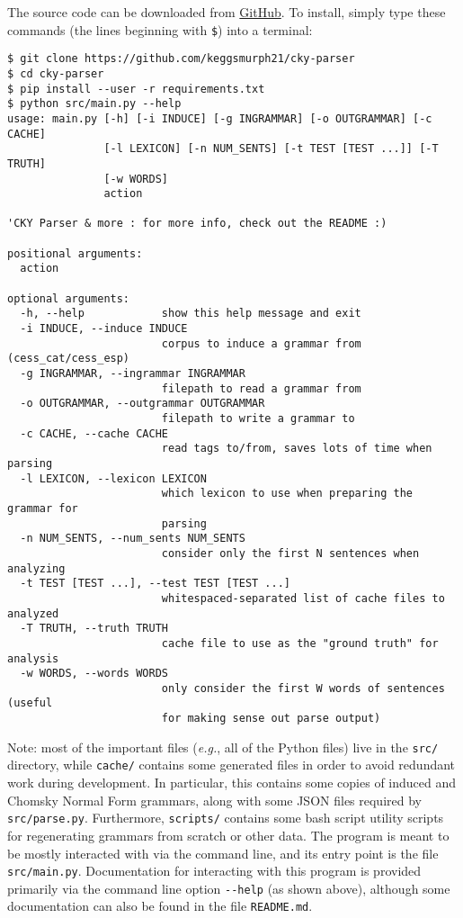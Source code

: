 \documentclass[paper=a4, fontsize=11pt]{scrartcl} %
\begin{document}
The source code can be downloaded from \href{https://github.com/keggsmurph21/cky-parser}{GitHub}.  To install, simply type these commands (the lines beginning with \texttt{\$}) into a terminal:
\begin{verbatim}
$ git clone https://github.com/keggsmurph21/cky-parser
$ cd cky-parser
$ pip install --user -r requirements.txt
$ python src/main.py --help
usage: main.py [-h] [-i INDUCE] [-g INGRAMMAR] [-o OUTGRAMMAR] [-c CACHE]
               [-l LEXICON] [-n NUM_SENTS] [-t TEST [TEST ...]] [-T TRUTH]
               [-w WORDS]
               action

'CKY Parser & more : for more info, check out the README :)

positional arguments:
  action

optional arguments:
  -h, --help            show this help message and exit
  -i INDUCE, --induce INDUCE
                        corpus to induce a grammar from (cess_cat/cess_esp)
  -g INGRAMMAR, --ingrammar INGRAMMAR
                        filepath to read a grammar from
  -o OUTGRAMMAR, --outgrammar OUTGRAMMAR
                        filepath to write a grammar to
  -c CACHE, --cache CACHE
                        read tags to/from, saves lots of time when parsing
  -l LEXICON, --lexicon LEXICON
                        which lexicon to use when preparing the grammar for
                        parsing
  -n NUM_SENTS, --num_sents NUM_SENTS
                        consider only the first N sentences when analyzing
  -t TEST [TEST ...], --test TEST [TEST ...]
                        whitespaced-separated list of cache files to analyzed
  -T TRUTH, --truth TRUTH
                        cache file to use as the "ground truth" for analysis
  -w WORDS, --words WORDS
                        only consider the first W words of sentences (useful
                        for making sense out parse output)

\end{verbatim}

Note: most of the important files (\textit{e.g.}, all of the Python files) live in the \texttt{src/} directory, while \texttt{cache/} contains some generated files in order to avoid redundant work during development.  In particular, this contains some copies of induced and Chomsky Normal Form grammars, along with some JSON files required by \texttt{src/parse.py}.  Furthermore, \texttt{scripts/} contains some bash script utility scripts for regenerating grammars from scratch or other data.  The program is meant to be mostly interacted with via the command line, and its entry point is the file \texttt{src/main.py}.  Documentation for interacting with this program is provided primarily via the command line option \texttt{{-}{-}help} (as shown above), although some documentation can also be found in the file \texttt{README.md}.
\end{document}
